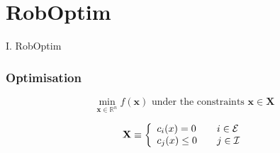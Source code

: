 


\begin{frame}[plain]
  \titlepage
\end{frame}

\begin{frame}
  \tableofcontents
\end{frame}

\section{RobOptim}
\begin{frame}
   \vfill
   \begin{center}
     \Large I. RobOptim
   \end{center}
   \vfill
\end{frame}

\begin{frame}
  \frametitle{Optimisation}

  \begin{equation*}
    \min_{\mathbf{x} \in \mathbb{R}^n} f(\mathbf{x})%
    \text{ under the constraints } \mathbf{x} \in \mathbf{X}
  \end{equation*}
  
  \begin{equation*}
    \mathbf{X} \equiv \left\{
    \begin{array}{l l}
      c_i (x) = 0    & \quad i \in \mathcal{E} \\
      c_j (x) \leq 0 & \quad j \in \mathcal{I} \\
    \end{array} \right.
  \end{equation*}
\end{frame}



